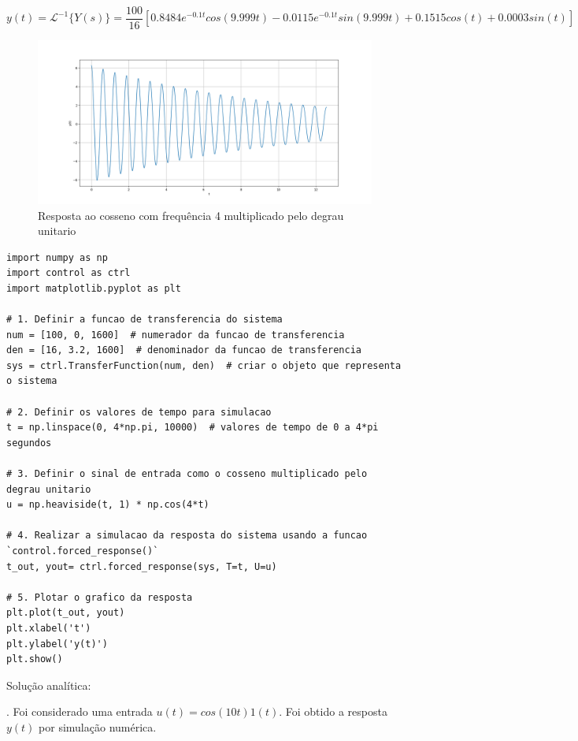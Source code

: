 \documentclass[10pt]{article}
\begin{document}
\begin{equation}
    y(t) = \mathcal{L}^{-1} \{Y(s) \} = \frac{100}{16} \left[ 0.8484e^{-0.1t}cos(9.999t) - 0.0115e^{-0.1t}sin(9.999t) + 0.1515cos(t) + 0.0003sin(t) \right]
\end{equation}

\begin{figure}[h]
    \centering
    \includegraphics[scale=0.45]{questao2.png}
    \caption{Resposta ao cosseno com frequência 4 multiplicado pelo degrau unitario}
\end{figure}


\begin{lstlisting}
import numpy as np
import control as ctrl
import matplotlib.pyplot as plt

# 1. Definir a funcao de transferencia do sistema
num = [100, 0, 1600]  # numerador da funcao de transferencia
den = [16, 3.2, 1600]  # denominador da funcao de transferencia
sys = ctrl.TransferFunction(num, den)  # criar o objeto que representa o sistema

# 2. Definir os valores de tempo para simulacao
t = np.linspace(0, 4*np.pi, 10000)  # valores de tempo de 0 a 4*pi segundos

# 3. Definir o sinal de entrada como o cosseno multiplicado pelo degrau unitario
u = np.heaviside(t, 1) * np.cos(4*t)

# 4. Realizar a simulacao da resposta do sistema usando a funcao `control.forced_response()`
t_out, yout= ctrl.forced_response(sys, T=t, U=u)

# 5. Plotar o grafico da resposta
plt.plot(t_out, yout)
plt.xlabel('t')
plt.ylabel('y(t)')
plt.show()
\end{lstlisting}

\quad Solução analítica:

\newpage

. Foi considerado uma entrada $u(t) = cos(10 t) 1(t)$. Foi obtido a resposta $y(t)$ por simulação numérica.
\end{document}
